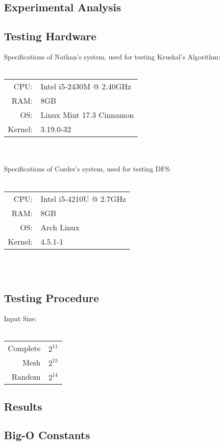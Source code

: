 \documentclass[titlepage]{article}
\begin{document}
\begin{multicols*}{2}
		\section{Experimental Analysis}
			\subsection{Testing Hardware}
				Specifications of Nathan's system, used for testing Kruskal's Algorithm: \\ \\
				\begin{tabular}{r l}
				CPU:    & Intel i5-2430M @ 2.40GHz \\
				RAM:    & 8GB \\
				OS:     & Linux Mint 17.3 Cinnamon \\
				Kernel: & 3.19.0-32 \\
				\end{tabular} \\ \\
				\noindent
				Specifications of Corder's system, used for testing DFS: \\ \\
				\begin{tabular}{r l}
				CPU:    & Intel i5-4210U @ 2.7GHz \\
				RAM:    & 8GB \\
				OS:     & Arch Linux \\
				Kernel: & 4.5.1-1 \\
				\end{tabular} \\ \\

			\subsection{Testing Procedure}
				Input Size: \\ \\
				\begin{tabular}{r l}
				Complete 	& $2^{11}$ \\
				Mesh 		& $2^{15}$ \\
				Random 		& $2^{14}$ \\
				\end{tabular}

			\subsection{Results}
			\subsection{Big-O Constants}

\end{multicols*}
\end{document}
